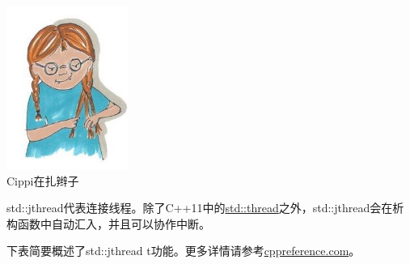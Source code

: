 \begin{center}
\includegraphics[width=0.3\textwidth]{content/3/chapter6/images/24.png}\\
Cippi在扎辫子
\end{center}

std::jthread代表连接线程。除了C++11中的\href{https://en.cppreference.com/w/cpp/thread/thread}{std::thread}之外，std::jthread会在析构函数中自动汇入，并且可以协作中断。

下表简要概述了std::jthread t功能。更多详情请参考\href{https://en.cppreference.com/w/cpp/thread/jthread}{cppreference.com}。


